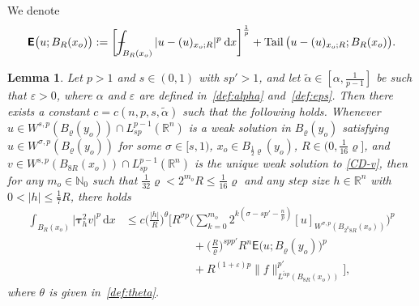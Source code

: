 \documentclass[10pt,letterpaper]{amsart}
\newtheorem{lemma}[theorem]{Lemma}
\theoremstyle{definition}
\numberwithin{theorem}{section}
\numberwithin{equation}{section}
\newcommand{\1}{\ensuremath{\mathds{1}}}
\newcommand{\dx}{\mathrm{d}x}
\newcommand\sfE{{\boldsymbol{\mathsf E}}}
\def\Xint#1{\mathchoice
    {\XXint\displaystyle\textstyle{#1}}%
    {\XXint\textstyle\scriptstyle{#1}}%
    {\XXint\scriptstyle\scriptscriptstyle{#1}}%
    {\XXint\scriptscriptstyle\scriptscriptstyle{#1}}%
    \!\int}
\def\XXint#1#2#3{\setbox0=\hbox{$#1{#2#3}{\int}$}
    \vcenter{\hbox{$#2#3$}}\kern-0.5\wd0}
\def\bint{\Xint-}
\renewcommand{\epsilon}{\varepsilon}
\renewcommand{\rho}{\varrho}
\renewcommand{\epsilon}{\varepsilon}
\renewcommand{\rho}{\varrho}
\renewcommand{\d}{\:\! \mathrm{d}}
\DeclareMathOperator{\Tail}{Tail}
\numberwithin{equation}{section}
\begin{document}
We denote 
$$
    \sfE\big(u;B_R(x_o)\big) 
    := 
    \bigg[ \bint_{B_R(x_o)} |u - (u)_{x_o;R}|^p \, \d x \bigg]^\frac{1}{p} + 
    \Tail \big( u - (u)_{x_o;R} ; B_R(x_o) \big).
$$




\begin{lemma}\label{lem:vi}
Let $p>1$ and $s\in(0,1)$ with $sp'>1$, and let $\tilde\alpha\in[\alpha,\frac{1}{p-1}]$ be such that $\epsilon>0$, where $\alpha$ and $\epsilon$ are defined in~\eqref{def:alpha} and~\eqref{def:eps}. 
Then there exists a constant $c=c(n,p,s,\tilde\alpha)$ such that the following holds.
Whenever
\(u \in W^{s,p}(B_\rho(y_o))\cap L^{p-1}_{sp}(\mathbb{R}^n)\)
is a weak solution in \(B_\rho(y_o)\) satisfying 
\(u \in W^{\sigma,p}(B_\rho(y_o))\) for some \(\sigma\in[s,1)\), 
\(x_o\in B_{\frac12 \rho}(y_o)\),  \(R\in(0,\frac1{16}\rho]\),
and
\(v \in W^{s,p}(B_{8R}(x_o))\cap L^{p-1}_{sp}(\mathbb{R}^n)\)
is the unique weak solution to \eqref{CD-v},
then for any \(m_o\in\mathbb{N}_0\) such that
\(\tfrac{1}{32}\rho<2^{m_o}R\le\tfrac{1}{16}\rho\) and any
step size \(h\in\mathbb{R}^n\) with \(0<|h|\le \tfrac17 R\), there holds
\begin{align*}
    \int_{B_R(x_o)} \big|\boldsymbol{\tau}_h^2 v\big|^p \,\dx
    &\le
    c \Big(\frac{|h|}{R}\Big)^{\theta}
    \Bigg[
        R^{\sigma p}
        \Bigg(
            \sum_{k=0}^{m_o}
            2^{k(\sigma-sp' - \frac{n}{p})}
            [u]_{W^{\sigma,p}(B_{2^k 8R}(x_o))}
        \Bigg)^p \\
    &\qquad\qquad\qquad
        + \Big(\frac{R}{\rho}\Big)^{spp'} R^n\sfE\big(u;B_\rho(y_o)\big)^p \\
    &\qquad\qquad\qquad + 
        R^{(1+\epsilon)p}
        \|f\|_{L^{\tilde\alpha p}(B_{8R}(x_o))}^{p'}
    \Bigg],
\end{align*}
where $\theta$ is given in~\eqref{def:theta}.
\end{lemma}
\end{document}
